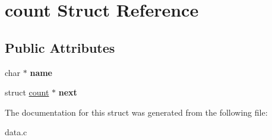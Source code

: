 \hypertarget{structcount}{\section{count Struct Reference}
\label{structcount}
}
\subsection*{Public Attributes}
\begin{DoxyCompactItemize}
\item 
\hypertarget{structcount_a772cc52984f7db74414ee5d1e03dc360}{char $\ast$ {\bfseries name}}\label{structcount_a772cc52984f7db74414ee5d1e03dc360}

\item 
\hypertarget{structcount_a7bed7b7888c42cd3f966df58664d5f9c}{struct \hyperlink{structcount}{count} $\ast$ {\bfseries next}}\label{structcount_a7bed7b7888c42cd3f966df58664d5f9c}

\end{DoxyCompactItemize}


The documentation for this struct was generated from the following file\-:\begin{DoxyCompactItemize}
\item 
data.\-c\end{DoxyCompactItemize}
